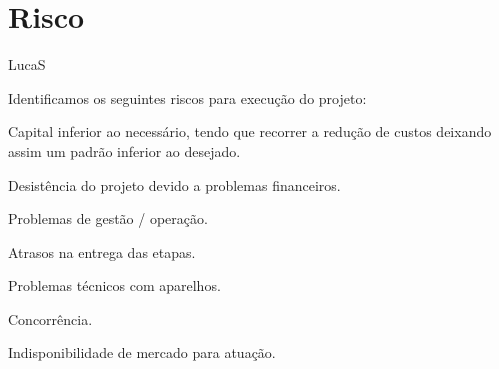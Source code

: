 \chapter[Risco]{Risco}

LucaS

Identificamos os seguintes riscos para execução do projeto:

\begin{alineas}
    \item Capital inferior ao necessário, tendo que recorrer a redução de custos deixando assim um padrão inferior ao desejado.
    \item Desistência do projeto devido a problemas financeiros.
    \item Problemas de gestão / operação.
    \item Atrasos na entrega das etapas.
    \item Problemas técnicos com aparelhos.
    \item Concorrência.
    \item Indisponibilidade de mercado para atuação.
\end{alineas}

